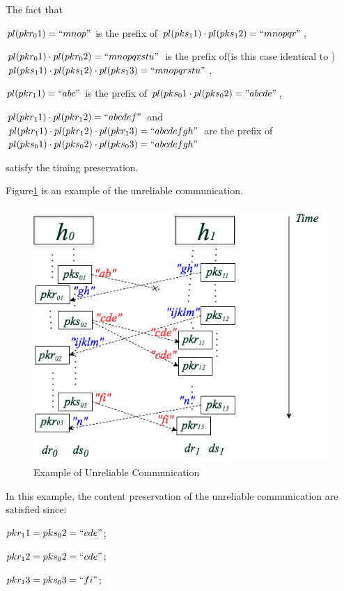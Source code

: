 The fact that
 
$pl(pkr_01) = ``mnop"$ is the prefix of $pl(pks_11) \cdot  pl(pks_12) = ``mnopqr"$,

$pl(pkr_01) \cdot pl(pkr_02)=``mnopqrstu"$ is the prefix of(is this case identical to ) $pl(pks_11) \cdot pl(pks_12) \cdot pl(pks_13) = ``mnopqrstu" $,  

$pl(pkr_11)=``abc"$ is the prefix of $pl(pks_01 \cdot pl(pks_02) = "abcde"$,  

$pl(pkr_11) \cdot pl(pkr_12)= ``abcdef"$ and  $pl(pkr_11) \cdot pl(pkr_12) \cdot pl(pkr_13) = ``abcdefgh"$ are  the prefix of  $pl(pks_01) \cdot pl(pks_02) \cdot pl(pks_03)= ``abcdefgh"$

satisfy the timing preservation. 


Figure\ref{unreliableexample} is an example of the unreliable communication. 

\begin{figure}[H]
\centerline{\includegraphics[scale=0.55]{Figures/unreliableexample}}
\caption{Example of Unreliable Communication}
\label{unreliableexample}
\end{figure}

In this example, the content preservation of the unreliable communication are satisfied since: 

$pkr_11 = pks_02=``cde"$; 

$pkr_12 = pks_02=``cde"$;

$pkr_13 = pks_03=``fi"$;

